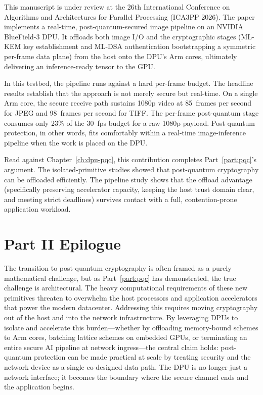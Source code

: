 This manuscript is under review at the 26th International Conference on Algorithms and Architectures for Parallel Processing (ICA3PP 2026). The paper implements a real-time, post-quantum-secured image pipeline on an NVIDIA BlueField-3 DPU. It offloads both image I/O and the cryptographic stages (ML-KEM key establishment and ML-DSA authentication bootstrapping a symmetric per-frame data plane) from the host onto the DPU's Arm cores, ultimately delivering an inference-ready tensor to the GPU.

In this testbed, the pipeline runs against a hard per-frame budget. The headline results establish that the approach is not merely secure but real-time. On a single Arm core, the secure receive path sustains 1080p video at 85~frames per second for JPEG and 98~frames per second for TIFF. The per-frame post-quantum stage consumes only 23\% of the 30~fps budget for a raw 1080p payload. Post-quantum protection, in other words, fits comfortably within a real-time image-inference pipeline when the work is placed on the DPU.

Read against Chapter~\ref{ch:dpu-pqc}, this contribution completes Part~\ref{part:pqc}'s argument. The isolated-primitive studies showed that post-quantum cryptography can be offloaded efficiently. The pipeline study shows that the offload advantage (specifically preserving accelerator capacity, keeping the host trust domain clear, and meeting strict deadlines) survives contact with a full, contention-prone application workload.


\section{Part II Epilogue}
\label{sec:end-to-end-discussion}

The transition to post-quantum cryptography is often framed as a purely mathematical challenge, but as Part~\ref{part:pqc} has demonstrated, the true challenge is architectural. The heavy computational requirements of these new primitives threaten to overwhelm the host processors and application accelerators that power the modern datacenter. Addressing this requires moving cryptography out of the host and into the network infrastructure. By leveraging DPUs to isolate and accelerate this burden---whether by offloading memory-bound schemes to Arm cores, batching lattice schemes on embedded GPUs, or terminating an entire secure AI pipeline at network ingress---the central claim holds: post-quantum protection can be made practical at scale by treating security and the network device as a single co-designed data path. The DPU is no longer just a network interface; it becomes the boundary where the secure channel ends and the application begins.

